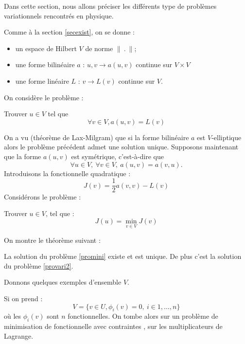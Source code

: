 \documentclass[12pt]{book}
\begin{document}
Dans cette section, nous allons  pr\'eciser les
diff\'erents type de probl\`emes variationnels rencontr\'es en
physique.

Comme \`a la section \ref{secexist}, on se donne :
\begin{itemize}
\item un espace de Hilbert $V$ de norme $\|\ .\ \|$;
\item une forme bilin\'eaire $a$ : $u,v\rightarrow a(u,v)$ continue
sur $V\times V$
\item une forme lin\'eaire $L$ : $v\rightarrow L(v)$ continue sur $V$.
\end{itemize}
On consid\`ere le probl\`eme :
\begin{prob}\label{provari2} 
Trouver $u\in V$ tel que 
\begin{equation}
\forall v\in V, a(u,v)=L(v)
\end{equation}
\end{prob}
On a vu (th\'eor\`eme de Lax-Milgram) que
si la forme bilin\'eaire $a$ est $V$-elliptique
alors le probl\`eme pr\'ec\'edent admet une solution unique.
Supposons maintenant que la forme $a(u,v)$ est sym\'etrique,
c'est-\`a-dire que 
\begin{equation}
\forall u\in V,\ \forall v\in V,\ a(u,v)=a(v,u).
\end{equation}
Introduisons la fonctionnelle quadratique :
\begin{equation}
J(v)=\frac{1}{2}a(v,v)-L(v)
\end{equation}
Consid\'erons le probl\`eme :
\begin{prob}\label{promini}
Trouver $u\in V$, tel que :
\begin{equation}
J(u)=\min_{v\in V} J(v)
\end{equation}
\end{prob}
On montre le th\'eor\`eme suivant :
\begin{thm}
La solution du probl\`eme \ref{promini} existe et est unique. De plus
c'est la solution du probl\`eme \ref{provari2}.
\end{thm}
Donnons quelques exemples d'ensemble $V$.
\begin{exmp}
Si on prend :
\begin{equation}
V=\{v\in U, \phi_{i}(v)=0,\ i\in 1,\dots,n \}
\end{equation}
o\`u les $\phi_{i}(v)$ sont $n$ fonctionnelles.
On tombe alors sur un probl\`eme de minimisation de fonctionnelle avec
contraintes \cite{ma:equad:Ciarlet88}, sur les
multiplicateurs de Lagrange. 
\end{exmp}
\end{document}
